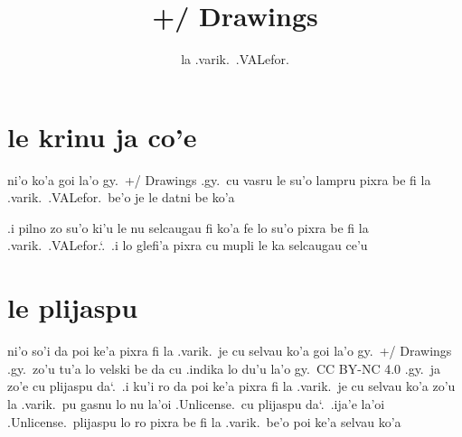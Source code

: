 \documentclass{report}
\title{+/ Drawings}
\author{la .varik.\ .VALefor.}
\newcommand\sds{\spacefactor\sfcode`.\ \space}
\begin{document}
\maketitle{}
\tableofcontents{}
\chapter{le krinu ja co'e}
ni'o ko'a goi la'o gy.\ +/ Drawings .gy.\ cu vasru le su'o lampru pixra be fi la .varik.\ .VALefor.\ be'o je le datni be ko'a

.i pilno zo su'o ki'u le nu selcaugau fi ko'a fe lo su'o pixra be fi la .varik.\ .VALefor.\sds .i lo glefi'a pixra cu mupli le ka selcaugau ce'u

\chapter{le plijaspu}
ni'o so'i da poi ke'a pixra fi la .varik.\ je cu selvau ko'a goi la'o gy.\ +/ Drawings .gy.\ zo'u tu'a lo velski be da cu .indika lo du'u la'o gy.\ CC BY-NC 4.0 .gy.\ ja zo'e cu plijaspu da\sds  .i ku'i ro da poi ke'a pixra fi la .varik.\ je cu selvau ko'a zo'u la .varik.\ pu gasnu lo nu la'oi .Unlicense.\ cu plijaspu da\sds  .ija'e la'oi .Unlicense.\ plijaspu lo ro pixra be fi la .varik.\ be'o poi ke'a selvau ko'a
\end{document}
